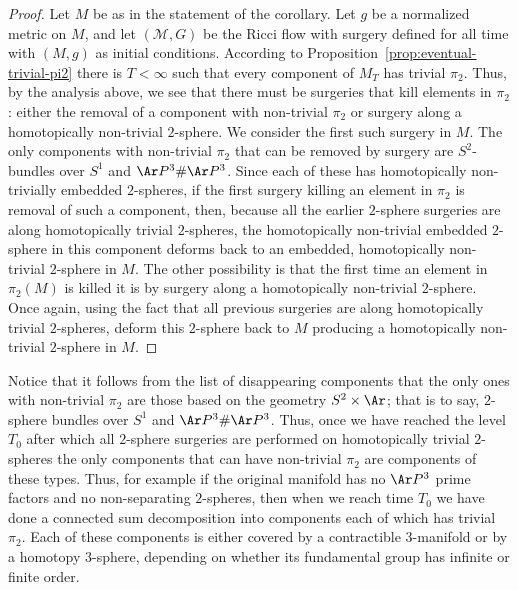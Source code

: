 \begin{proof}
Let $M$ be as in the statement of the corollary. Let $g$ be a
normalized metric on $M$, and let $({\mathcal M},G)$ be the Ricci
flow with surgery defined for all time with $(M,g)$ as initial
conditions. According to Proposition~\ref{prop:eventual-trivial-pi2} there is $T<\infty$
such that every component of $M_T$ has trivial $\pi_2$. Thus, by the
analysis above, we see that there must be surgeries that kill
elements in $\pi_2$: either the removal of a component with
non-trivial $\pi_2$ or surgery along a homotopically non-trivial
$2$-sphere. We consider the first such surgery in $M$.
 The only
components with non-trivial $\pi_2$ that can be removed by surgery
are $S^2$-bundles over $S^1$ and $\Ar P^3\#\Ar P^3$. Since each of
these has homotopically non-trivially embedded $2$-spheres, if the
first surgery killing an element in $\pi_2$ is removal of such a
component, then, because all the earlier $2$-sphere surgeries are
along homotopically trivial $2$-spheres, the homotopically
non-trivial embedded $2$-sphere in this component deforms back to an
embedded, homotopically non-trivial $2$-sphere in $M$.  The other
possibility is that the first time an element in $\pi_2(M)$ is
killed it is by surgery along a homotopically non-trivial
$2$-sphere. Once again, using the fact that all previous surgeries
are along homotopically trivial $2$-spheres, deform this $2$-sphere
back to $M$ producing a homotopically non-trivial $2$-sphere in $M$.
\end{proof}

\begin{remark}
\label{rem:pi2-disappearing-components}
Notice that it follows from the list of disappearing components that
the only ones with non-trivial $\pi_2$ are those based on the
geometry $S^2\times \Ar$; that is to say, $2$-sphere bundles over
$S^1$ and $\Ar P^3\#\Ar P^3$. Thus, once we have reached the level
$T_0$ after which all $2$-sphere surgeries are performed on
homotopically trivial $2$-spheres the only components that can have
non-trivial $\pi_2$ are components of these types. Thus, for example
if the original manifold has no $\Ar P^3$ prime factors and no
non-separating $2$-spheres, then when we reach time $T_0$ we have
done a connected sum decomposition into components each of which has
trivial $\pi_2$. Each of these components is either covered by a
contractible $3$-manifold or by a homotopy $3$-sphere, depending on
whether its fundamental group has infinite or finite order.
\end{remark}





